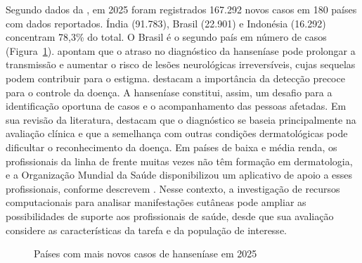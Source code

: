 Segundo dados da , em 2025 foram registrados
167.292 novos casos em 180 países com dados reportados. Índia (91.783),
Brasil (22.901) e Indonésia (16.292) concentram 78,3\% do total. O Brasil
é o segundo país em número de casos (Figura~\ref{fig:casos-paises}).
 apontam que o atraso no diagnóstico da hanseníase
pode prolongar a transmissão e aumentar o risco de lesões neurológicas
irreversíveis, cujas sequelas podem contribuir para o estigma.
 destacam a importância da detecção precoce para o
controle da doença. A hanseníase constitui, assim, um desafio para a
identificação oportuna de casos e o acompanhamento das pessoas afetadas.
Em sua revisão da literatura,  destacam que
o diagnóstico se baseia principalmente na avaliação clínica e que a semelhança com outras
condições dermatológicas pode dificultar o reconhecimento da doença. Em
países de baixa e média renda, os profissionais da linha de frente muitas
vezes não têm formação em dermatologia, e a Organização Mundial da Saúde
disponibilizou um aplicativo de apoio a esses profissionais, conforme
descrevem . Nesse contexto, a investigação de recursos
computacionais para analisar manifestações cutâneas pode ampliar as
possibilidades de suporte aos profissionais de saúde, desde que sua
avaliação considere as características da tarefa e da população de
interesse.

\begin{figure}[htbp]
	\centering
	\caption{Países com mais novos casos de hanseníase em 2025}
	\label{fig:casos-paises}
\end{figure}

